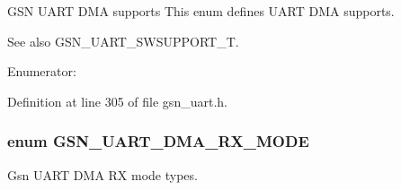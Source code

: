 GSN UART DMA supports This enum defines UART DMA supports. 

\begin{DoxySeeAlso}{See also}
GSN\_\-UART\_\-SWSUPPORT\_\-T. 
\end{DoxySeeAlso}
\begin{Desc}
\item[Enumerator: ]\par
\begin{description}
\item[{\em 
\hypertarget{a00656_gga48e5ede8ddc3ed1b7967288df611c09da61e84f0813edd6dddf49f60631c4e98f}{
GSN\_\-UART\_\-DMA\_\-NO\_\-SUPPORT}
\label{a00656_gga48e5ede8ddc3ed1b7967288df611c09da61e84f0813edd6dddf49f60631c4e98f}
}]\item[{\em 
\hypertarget{a00656_gga48e5ede8ddc3ed1b7967288df611c09da04012c54ff5d366f0f59b2807e15275c}{
GSN\_\-UART\_\-DMA\_\-SUPPORT}
\label{a00656_gga48e5ede8ddc3ed1b7967288df611c09da04012c54ff5d366f0f59b2807e15275c}
}]\end{description}
\end{Desc}



Definition at line 305 of file gsn\_\-uart.h.

\hypertarget{a00656_gaef21b1191deb90943f343ad04ef5339b}{
\subsubsection[{GSN\_\-UART\_\-DMA\_\-RX\_\-MODE}]{\setlength{\rightskip}{0pt plus 5cm}enum {\bf GSN\_\-UART\_\-DMA\_\-RX\_\-MODE}}}
\label{a00656_gaef21b1191deb90943f343ad04ef5339b}


Gsn UART DMA RX mode types. 

